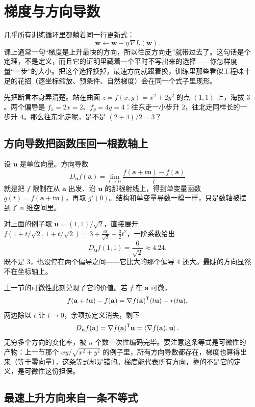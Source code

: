 \section{梯度与方向导数}
\label{sec:02-Calculus/06-Multivariable-Calculus/03}

几乎所有训练循环里都躺着同一行更新式：
\[
\mathbf w\leftarrow\mathbf w-\eta\,\nabla L(\mathbf w).
\]
课上通常一句``梯度是上升最快的方向，所以往反方向走''就带过去了。这句话是个定理，不是定义，而且它的证明里藏着一个平时不写出来的选择——你怎样度量``一步''的大小。把这个选择换掉，最速方向就跟着换，训练里那些看似工程味十足的花招（逐坐标缩放、预条件、自然梯度）会在同一个式子里现形。

先把断言本身弄清楚。站在曲面 \(z=f(x,y)=x^2+2y^2\) 的点 \((1,1)\) 上，海拔 \(3\)。两个偏导是 \(f_x=2x=2\)、\(f_y=4y=4\)：往东走一小步升 \(2\)，往北走同样长的一步升 \(4\)。那么往东北走呢，是不是 \((2+4)/2=3\)？

\subsection{方向导数把函数压回一根数轴上}

设 \(\mathbf u\) 是单位向量。方向导数
\[
D_{\mathbf u}f(\mathbf a)
=\lim_{t\to0}\frac{f(\mathbf a+t\mathbf u)-f(\mathbf a)}{t}
\]
就是把 \(f\) 限制在从 \(\mathbf a\) 出发、沿 \(\mathbf u\) 的那根射线上，得到单变量函数 \(g(t)=f(\mathbf a+t\mathbf u)\)，再取 \(g'(0)\)。结构和单变量导数一模一样，只是数轴被摆到了 \(n\) 维空间里。

对上面的例子取 \(\mathbf u=(1,1)/\sqrt2\)，直接展开 \(f(1+t/\sqrt2,\,1+t/\sqrt2)=3+\tfrac{6t}{\sqrt2}+\tfrac32t^2\)，一阶系数给出
\[
D_{\mathbf u}f(1,1)=\frac{6}{\sqrt2}\approx 4.24 .
\]
既不是 \(3\)，也没停在两个偏导之间——它比大的那个偏导 \(4\) 还大。最陡的方向显然不在坐标轴上。

上一节的可微性此刻兑现了它的价值。若 \(f\) 在 \(\mathbf a\) 可微，
\[
f(\mathbf a+t\mathbf u)-f(\mathbf a)=\nabla f(\mathbf a)^{\mathsf{T}}(t\mathbf u)+r(t\mathbf u),
\]
两边除以 \(t\) 让 \(t\to0\)，余项按定义消失，剩下
\[
D_{\mathbf u}f(\mathbf a)=\nabla f(\mathbf a)^{\mathsf{T}}\mathbf u
=\left\langle\nabla f(\mathbf a),\mathbf u\right\rangle.
\]
无穷多个方向的变化率，被 \(n\) 个数一次性编码完毕。要注意这条等式是可微性的产物：上一节那个 \(xy/\sqrt{x^2+y^2}\) 的例子里，所有方向导数都存在，梯度也算得出来（等于零向量），这条等式却是错的。梯度能代表所有方向，靠的不是它的定义，是可微性这份担保。

\subsection{最速上升方向来自一条不等式}

